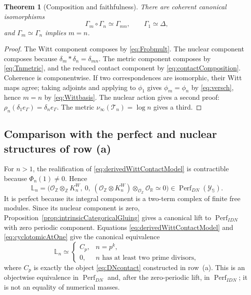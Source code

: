 \documentclass[11pt]{amsart}
\newtheorem{theorem}{Theorem}[section]
\theoremstyle{definition}
\theoremstyle{remark}
\newcommand{\R}{\mathbb R}
\newcommand{\Z}{\mathbb Z}
\begin{document}
\begin{theorem}[Composition and faithfulness]\label{thm:rowbcompose}
There are coherent canonical isomorphisms
\[
 \Gamma_m\circ\Gamma_n\simeq\Gamma_{mn},\qquad
 \Gamma_1\simeq\Delta,
\]
and $\Gamma_m\simeq\Gamma_n$ implies $m=n$.
\end{theorem}

\begin{proof}
The Witt component composes by \eqref{eq:Frobmult}.  The nuclear component
composes because $\delta_m*\delta_n=\delta_{mn}$.  The metric component
composes by \eqref{eq:Tnmetric}, and the reduced contact component by
\eqref{eq:contactComposition}.  Coherence is componentwise.  If two
correspondences are isomorphic, their Witt maps agree; taking adjoints and
applying to $\phi_1$ gives $\phi_m=\phi_n$ by \eqref{eq:versch}, hence
$m=n$ by \eqref{eq:Wittbasis}.  The nuclear action gives a second proof:
$\rho_n(\delta_1e_\Gamma)=\delta_ne_\Gamma$.  The metric
$\nu_\infty(\mathcal T_n)=\log n$ gives a third.
\end{proof}

\subsection{Comparison with the perfect and nuclear structures of row (a)}

For $n>1$, the realification of \eqref{eq:derivedWittContactModel} is
contractible because $\Phi_n(1)\ne0$.  Hence
\begin{equation}\label{eq:DNLefschetzComplex}
 \mathbb L_n=
 \bigl(\mathcal O_{\Z}\otimes_\Z K_n^W,\ 0,\
 (\mathcal O_{\Z}\otimes K_n^W)\otimes_{\mathcal O_{\Z}}
 \mathcal O_{\R}\simeq0\bigr)
 \in\operatorname{Perf}_{DN}(\mathscr Y_{\mathbb S}).
\end{equation}
It is perfect because its integral component is a two-term complex of
finite free modules.  Since its nuclear component is zero,
Proposition~\ref{prop:intrinsicCategoricalGluing} gives a canonical lift to
$\operatorname{Perf}_{IDN}$ with zero periodic component.  Equations
\eqref{eq:derivedWittContactModel} and \eqref{eq:cyclotomicAtOne} give the
canonical equivalence
\begin{equation}\label{eq:contactComparisonA}
 \mathbb L_n\simeq
 \begin{cases}
  C_p,&n=p^k,\\
  0,&n\text{ has at least two prime divisors},
 \end{cases}
\end{equation}
where $C_p$ is exactly the object \eqref{eq:DNcontact} constructed in
row~(a).  This is an objectwise equivalence in
$\operatorname{Perf}_{DN}$ and, after the zero-periodic lift, in
$\operatorname{Perf}_{IDN}$; it is not an equality of numerical masses.
\end{document}
